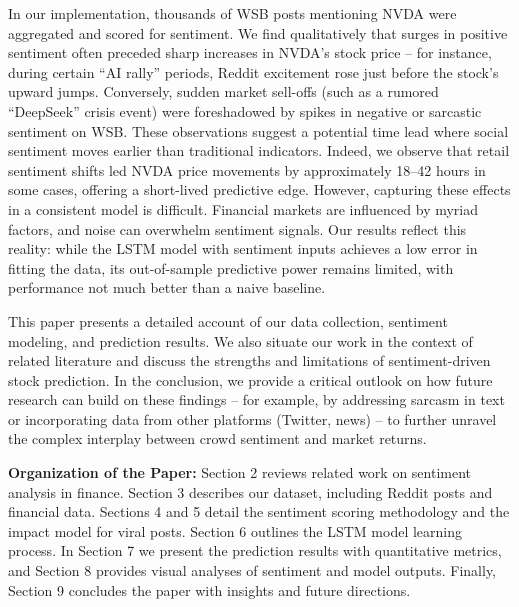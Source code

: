 \documentclass[conference]{IEEEtran}
\begin{document}
In our implementation, thousands of WSB posts mentioning NVDA were aggregated and scored for sentiment. We find qualitatively that surges in positive sentiment often preceded sharp increases in NVDA’s stock price – for instance, during certain “AI rally” periods, Reddit excitement rose just before the stock’s upward jumps. Conversely, sudden market sell-offs (such as a rumored “DeepSeek” crisis event) were foreshadowed by spikes in negative or sarcastic sentiment on WSB. These observations suggest a potential time lead where social sentiment moves earlier than traditional indicators. Indeed, we observe that retail sentiment shifts led NVDA price movements by approximately 18–42 hours in some cases, offering a short-lived predictive edge. However, capturing these effects in a consistent model is difficult. Financial markets are influenced by myriad factors, and noise can overwhelm sentiment signals. Our results reflect this reality: while the LSTM model with sentiment inputs achieves a low error in fitting the data, its out-of-sample predictive power remains limited, with performance not much better than a naive baseline.

This paper presents a detailed account of our data collection, sentiment modeling, and prediction results. We also situate our work in the context of related literature and discuss the strengths and limitations of sentiment-driven stock prediction. In the conclusion, we provide a critical outlook on how future research can build on these findings – for example, by addressing sarcasm in text or incorporating data from other platforms (Twitter, news) – to further unravel the complex interplay between crowd sentiment and market returns.

\textbf{Organization of the Paper:} Section 2 reviews related work on sentiment analysis in finance. Section 3 describes our dataset, including Reddit posts and financial data. Sections 4 and 5 detail the sentiment scoring methodology and the impact model for viral posts. Section 6 outlines the LSTM model learning process. In Section 7 we present the prediction results with quantitative metrics, and Section 8 provides visual analyses of sentiment and model outputs. Finally, Section 9 concludes the paper with insights and future directions.
\end{document}

